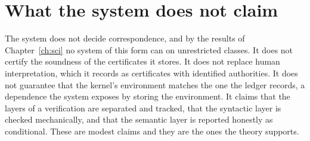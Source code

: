 \section{What the system does not claim}

The system does not decide correspondence, and by the results of Chapter~\ref{ch:sci} no system of this form can on unrestricted classes. It does not certify the soundness of the certificates it stores. It does not replace human interpretation, which it records as certificates with identified authorities. It does not guarantee that the kernel's environment matches the one the ledger records, a dependence the system exposes by storing the environment. It claims that the layers of a verification are separated and tracked, that the syntactic layer is checked mechanically, and that the semantic layer is reported honestly as conditional. These are modest claims and they are the ones the theory supports.
